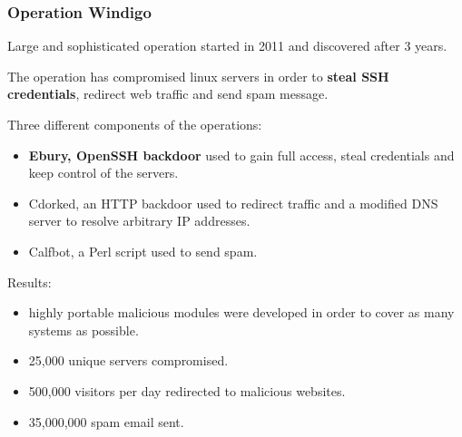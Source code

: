 \begin{frame}
	\frametitle{Operation Windigo}
	
	Large and sophisticated operation started in 2011 and discovered after 3 years.
	
	\smallskip
	
	The operation has compromised linux servers in order to \textbf{steal SSH credentials}, redirect web traffic and send spam message.
	
	\smallskip
	
  Three different components of the operations:
  
  \begin{itemize}
    \item \textbf{Ebury, OpenSSH backdoor} used to gain full access, steal credentials and keep control of the servers.
    \item Cdorked, an HTTP backdoor used to redirect traffic and a modified DNS server to resolve arbitrary IP addresses.
    \item Calfbot, a Perl script used to send spam.
  \end{itemize}	

	\smallskip
	
  Results:
  
  \begin{itemize}
    \item highly portable malicious modules were developed in order to cover as many systems as possible.
    \item 25,000 unique servers compromised.
    \item 500,000 visitors per day redirected to malicious websites.
    \item 35,000,000 spam email sent.
  \end{itemize}
\end{frame}


